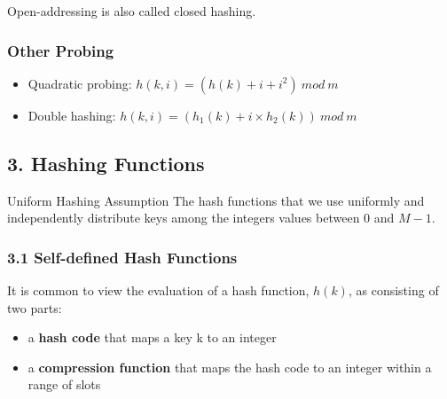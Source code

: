 \documentclass[aspectratio=169, 14pt]{beamer}
\begin{document}
{
\begin{frame}[standout]
  Open-addressing is also called closed hashing.
\end{frame}
}

\begin{frame}
    \frametitle{Other Probing}

    \begin{itemize}
        \item Quadratic probing: $h(k, i) = (h(k) + i + i^2) \ mod \ m$
        \item Double hashing: $h(k, i) = (h_1(k) + i \times h_2(k)) \ mod \ m$
    \end{itemize}

\end{frame}

\begin{frame}

    \section{\textcolor{darkmidnightblue}{3. Hashing Functions}}

    \begin{exampleblock}{Uniform Hashing Assumption}
        The hash functions that we use uniformly and independently distribute keys among the integers values between $0$ and $M - 1$.    
    \end{exampleblock}

\end{frame}

\begin{frame}
    \frametitle{3.1 Self-defined Hash Functions}


    It is common to view the evaluation of a hash function, $h(k)$, as consisting of two parts:
\begin{itemize}
    \item a \textbf{hash code} that maps a key k to an integer
    \item a \textbf{compression function} that maps the hash code to an integer within a range of slots
\end{itemize}

\end{frame}
\end{document}
